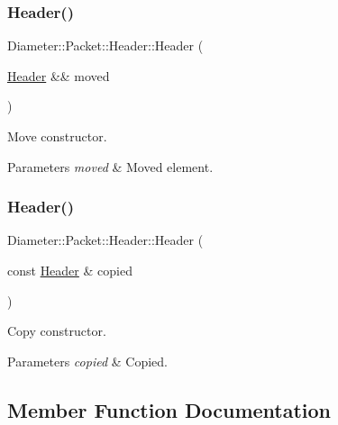 \subsubsection{\texorpdfstring{Header()}{Header()}\hspace{0.1cm}{\footnotesize\ttfamily [2/3]}}
{\footnotesize\ttfamily Diameter\+::\+Packet\+::\+Header\+::\+Header (\begin{DoxyParamCaption}\item[{\hyperlink{classDiameter_1_1Packet_1_1Header}{Header} \&\&}]{moved }\end{DoxyParamCaption})\hspace{0.3cm}{\ttfamily [noexcept]}}



Move constructor. 


\begin{DoxyParams}{Parameters}
{\em moved} & Moved element. \\
\hline
\end{DoxyParams}
\mbox{\label{classDiameter_1_1Packet_1_1Header_a5540196c67b52fa60945d12b1df28088}} 
\subsubsection{\texorpdfstring{Header()}{Header()}\hspace{0.1cm}{\footnotesize\ttfamily [3/3]}}
{\footnotesize\ttfamily Diameter\+::\+Packet\+::\+Header\+::\+Header (\begin{DoxyParamCaption}\item[{const \hyperlink{classDiameter_1_1Packet_1_1Header}{Header} \&}]{copied }\end{DoxyParamCaption})}



Copy constructor. 


\begin{DoxyParams}{Parameters}
{\em copied} & Copied. \\
\hline
\end{DoxyParams}


\subsection{Member Function Documentation}
\mbox{\label{classDiameter_1_1Packet_1_1Header_a6314789114068d9f3ba106e480cef70b}} 
